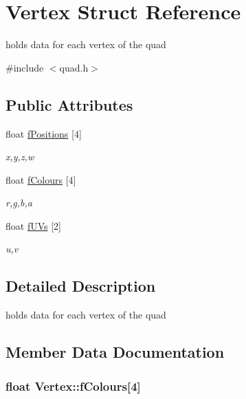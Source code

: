 \hypertarget{struct_vertex}{}\section{Vertex Struct Reference}
\label{struct_vertex}


holds data for each vertex of the quad  




{\ttfamily \#include $<$quad.\+h$>$}

\subsection*{Public Attributes}
\begin{DoxyCompactItemize}
\item 
float \hyperlink{struct_vertex_a1eafaa856610861f7e9b8bf82c2bdc81}{f\+Positions} \mbox{[}4\mbox{]}
\begin{DoxyCompactList}\small\item\em x,y,z,w \end{DoxyCompactList}\item 
float \hyperlink{struct_vertex_a1ef93fc4bc619549ce68fb0e1a239875}{f\+Colours} \mbox{[}4\mbox{]}
\begin{DoxyCompactList}\small\item\em r,g,b,a \end{DoxyCompactList}\item 
float \hyperlink{struct_vertex_acfa03b8678b2c3564fd3742d7da66c89}{f\+U\+Vs} \mbox{[}2\mbox{]}
\begin{DoxyCompactList}\small\item\em u,v \end{DoxyCompactList}\end{DoxyCompactItemize}


\subsection{Detailed Description}
holds data for each vertex of the quad 

\subsection{Member Data Documentation}
\hypertarget{struct_vertex_a1ef93fc4bc619549ce68fb0e1a239875}{}
\subsubsection[{f\+Colours}]{\setlength{\rightskip}{0pt plus 5cm}float Vertex\+::f\+Colours\mbox{[}4\mbox{]}}\label{struct_vertex_a1ef93fc4bc619549ce68fb0e1a239875}



